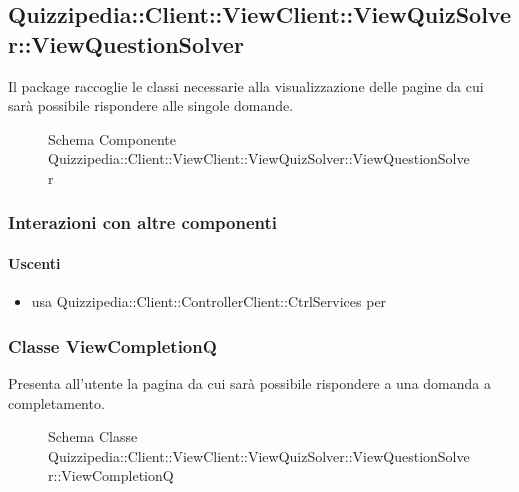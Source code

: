 \subsection{Quizzipedia::Client::ViewClient::ViewQuizSolver::ViewQuestionSolver}
Il package raccoglie le classi necessarie alla visualizzazione delle pagine da cui sarà possibile rispondere alle singole domande.
\begin{figure}[H]
\centering
\noindent{}
\caption[Schema Componente Quizzipedia::Client::ViewClient::ViewQuizSolver::ViewQuestionSolver]{Schema Componente Quizzipedia::Client::ViewClient::ViewQuizSolver::ViewQuestionSolver}
\end{figure}
\subsubsection{Interazioni con altre componenti}
\paragraph{Uscenti}
\begin{itemize}
\item usa Quizzipedia::Client::ControllerClient::CtrlServices per 
\end{itemize}
\subsubsection{Classe ViewCompletionQ}
Presenta all'utente la pagina da cui sarà possibile rispondere a una domanda a completamento.
\begin{figure}[H]
\centering
\noindent{}
\caption[Schema Classe ViewCompletionQ]{Schema Classe Quizzipedia::Client::ViewClient::ViewQuizSolver::ViewQuestionSolver::ViewCompletionQ}
\end{figure}
